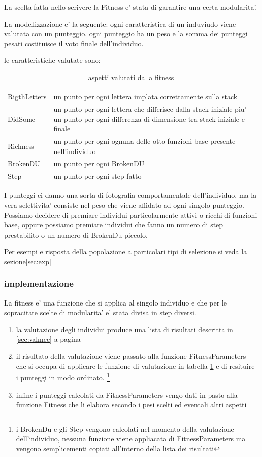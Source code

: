 \documentclass[12pt, a4paper]{article}
\begin{document}
La scelta fatta nello scrivere la Fitness e' stata di garantire una certa modularita'.

La modellizzazione e' la seguente: ogni caratteristica di un induviudo viene valutata con un punteggio.
ogni punteggio ha un peso e la somma dei punteggi pesati costituisce il voto finale dell'individuo.

le caratteristiche valutate sono:
\begin{table}[h]
\begin{tabular}{|l|p{10.0cm}|}
\hline	\\
RigthLetters	&	un punto per ogni lettera implata correttamente sulla stack	\\
DidSome			&	un punto per ogni lettera che differisce dalla stack iniziale piu' un punto per ogni differenza di dimensione tra stack iniziale e finale	\\
Richness		&	un punto per ogni ognuna delle otto funzioni base presente nell'individuo	\\
BrokenDU		&	un punto per ogni BrokenDU	\\
Step			&	un punto per ogni step fatto	\\
\hline
\end{tabular}
\caption{aspetti valutati dalla fitness}
\label{table:fitfunc}
\end{table}

I punteggi ci danno una sorta di fotografia comportamentale dell'individuo, ma la vera selettivita' consiste nel peso che viene affidato ad ogni singolo punteggio.
Possiamo decidere di premiare individui particolarmente attivi o ricchi di funzioni base, oppure possiamo premiare individui che fanno un numero di step prestabilito o un numero di BrokenDu piccolo.

Per esempi e risposta della popolazione a particolari tipi di selezione si veda la sezione\ref{sec:exp}

\subsubsection{implementazione}
La fitness e' una funzione che si applica al singolo individuo e che per le sopracitate scelte di modularita' e' stata divisa in step diversi.
\begin{enumerate}
\item la valutazione degli individui produce una lista di risultati descritta in \ref{sec:valmec} a pagina \pageref{sec:valmec}
\item il risultato della valutazione viene passato alla funzione FitnessParameters che si occupa di applicare le funzione di valutazione in tabella \ref{table:fitfunc} e di resituire i punteggi in modo ordinato.
\footnote{i BrokenDu e gli Step vengono calcolati nel momento della valutazione dell'individuo, nessuna funzione viene appliacata di FitnessParameters ma vengono semplicementi copiati all'interno della lista dei risultati}
\item infine i punteggi calcolati da FitnessParameters vengo dati in pasto alla funzione Fitness che li elabora secondo i pesi scelti ed eventali altri aspetti
\end{enumerate}
\end{document}
